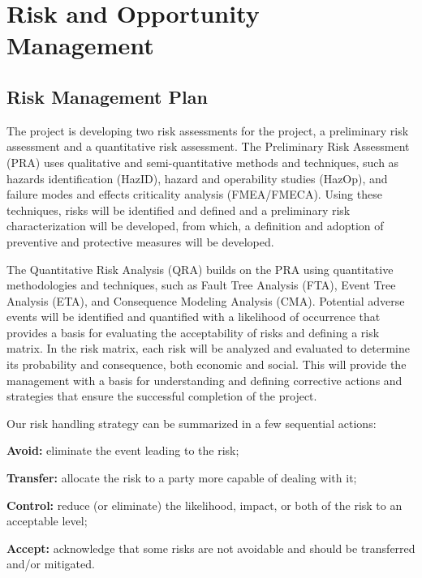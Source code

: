 \section{Risk and Opportunity Management}

\subsection{Risk Management Plan}

The project is developing two risk assessments for the project, a preliminary risk assessment and a quantitative risk assessment.  The Preliminary Risk Assessment (PRA) uses qualitative and semi-quantitative methods and techniques, such as hazards identification (HazID), hazard and operability studies (HazOp), and failure modes and effects criticality analysis (FMEA/FMECA).  Using these techniques, risks will be identified and defined and a preliminary risk characterization will be developed, from which, a definition and adoption of preventive and protective measures will be developed.

The Quantitative Risk Analysis (QRA) builds on the PRA using quantitative methodologies and techniques, such as Fault Tree Analysis (FTA), Event Tree Analysis (ETA), and Consequence Modeling Analysis (CMA).  Potential adverse events will be identified and quantified with a likelihood of occurrence that provides a basis for evaluating the acceptability of risks and defining a risk matrix. In the risk matrix, each risk will be analyzed and evaluated to determine its probability and consequence, both economic and social. This will provide the management with a basis for understanding and defining corrective actions and strategies that ensure the successful completion of the project.

Our risk handling strategy can be summarized in a few sequential actions:

\begin{compactitem}
\item[\bf Avoid:] eliminate the event leading to the risk;
\item[\bf Transfer:] allocate the risk to a party more capable of dealing with it;
\item[\bf Control:] reduce (or eliminate) the likelihood, impact, or both of the risk to an acceptable level; 
\item[\bf Accept:] acknowledge that some risks are not avoidable and should be transferred and/or mitigated. 
\end{compactitem}

